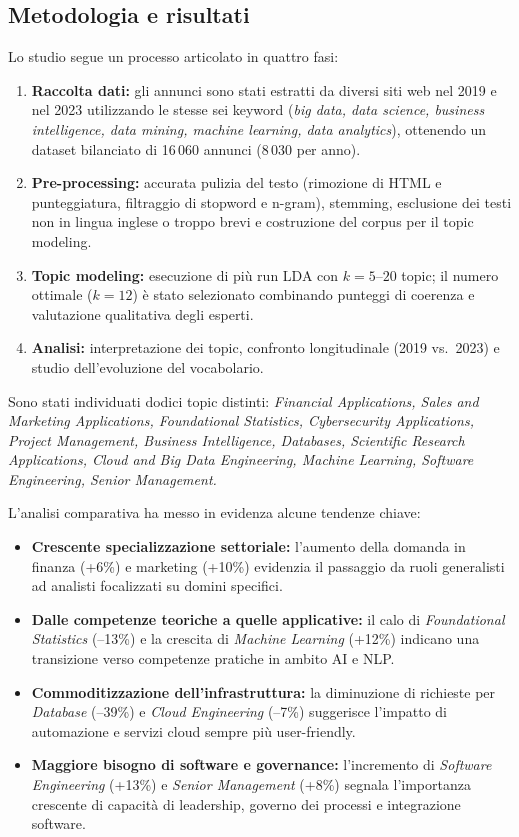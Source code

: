 \subsection{Metodologia e risultati}
Lo studio segue un processo articolato in quattro fasi:
\begin{enumerate}
    \item \textbf{Raccolta dati:} gli annunci sono stati estratti da diversi siti web nel 2019 e nel 2023 utilizzando le stesse sei keyword (\textit{big data, data science, business intelligence, data mining, machine learning, data analytics}), ottenendo un dataset bilanciato di 16\,060 annunci (8\,030 per anno).
    \item \textbf{Pre-processing:} accurata pulizia del testo (rimozione di HTML e punteggiatura, filtraggio di stopword e n-gram), stemming, esclusione dei testi non in lingua inglese o troppo brevi e costruzione del corpus per il topic modeling.
    \item \textbf{Topic modeling:} esecuzione di più run LDA con $k=5$--$20$ topic; il numero ottimale ($k=12$) è stato selezionato combinando punteggi di coerenza e valutazione qualitativa degli esperti.
    \item \textbf{Analisi:} interpretazione dei topic, confronto longitudinale (2019 vs.\ 2023) e studio dell'evoluzione del vocabolario.
\end{enumerate}

Sono stati individuati dodici topic distinti:
\textit{Financial Applications, Sales and Marketing Applications, Foundational Statistics, Cybersecurity Applications, Project Management, Business Intelligence, Databases, Scientific Research Applications, Cloud and Big Data Engineering, Machine Learning, Software Engineering, Senior Management.}

\noindent L'analisi comparativa ha messo in evidenza alcune tendenze chiave:
\begin{itemize}
    \item \textbf{Crescente specializzazione settoriale:} l'aumento della domanda in finanza (+6\%) e marketing (+10\%) evidenzia il passaggio da ruoli generalisti ad analisti focalizzati su domini specifici.
    \item \textbf{Dalle competenze teoriche a quelle applicative:} il calo di \textit{Foundational Statistics} (--13\%) e la crescita di \textit{Machine Learning} (+12\%) indicano una transizione verso competenze pratiche in ambito AI e NLP.
    \item \textbf{Commoditizzazione dell'infrastruttura:} la diminuzione di richieste per \textit{Database} (--39\%) e \textit{Cloud Engineering} (--7\%) suggerisce l'impatto di automazione e servizi cloud sempre più user-friendly.
    \item \textbf{Maggiore bisogno di software e governance:} l'incremento di \textit{Software Engineering} (+13\%) e \textit{Senior Management} (+8\%) segnala l'importanza crescente di capacità di leadership, governo dei processi e integrazione software.
\end{itemize}

